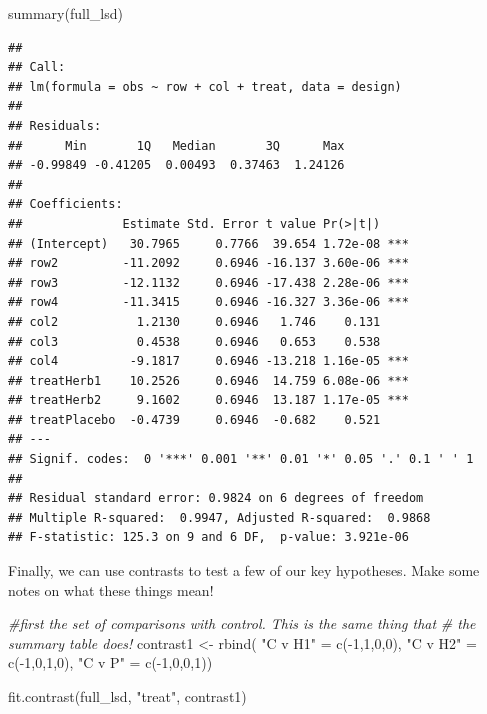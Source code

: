 \documentclass[
]{book}
\newenvironment{Shaded}{\begin{snugshade}}{\end{snugshade}}
\newcommand{\CommentTok}[1]{\textcolor[rgb]{0.56,0.35,0.01}{\textit{#1}}}
\newcommand{\DecValTok}[1]{\textcolor[rgb]{0.00,0.00,0.81}{#1}}
\newcommand{\FunctionTok}[1]{\textcolor[rgb]{0.00,0.00,0.00}{#1}}
\newcommand{\NormalTok}[1]{#1}
\newcommand{\OtherTok}[1]{\textcolor[rgb]{0.56,0.35,0.01}{#1}}
\newcommand{\SpecialCharTok}[1]{\textcolor[rgb]{0.00,0.00,0.00}{#1}}
\newcommand{\StringTok}[1]{\textcolor[rgb]{0.31,0.60,0.02}{#1}}
\begin{document}
\begin{Shaded}
\begin{Highlighting}[]
\FunctionTok{summary}\NormalTok{(full\_lsd)}
\end{Highlighting}
\end{Shaded}

\begin{verbatim}
## 
## Call:
## lm(formula = obs ~ row + col + treat, data = design)
## 
## Residuals:
##      Min       1Q   Median       3Q      Max 
## -0.99849 -0.41205  0.00493  0.37463  1.24126 
## 
## Coefficients:
##              Estimate Std. Error t value Pr(>|t|)    
## (Intercept)   30.7965     0.7766  39.654 1.72e-08 ***
## row2         -11.2092     0.6946 -16.137 3.60e-06 ***
## row3         -12.1132     0.6946 -17.438 2.28e-06 ***
## row4         -11.3415     0.6946 -16.327 3.36e-06 ***
## col2           1.2130     0.6946   1.746    0.131    
## col3           0.4538     0.6946   0.653    0.538    
## col4          -9.1817     0.6946 -13.218 1.16e-05 ***
## treatHerb1    10.2526     0.6946  14.759 6.08e-06 ***
## treatHerb2     9.1602     0.6946  13.187 1.17e-05 ***
## treatPlacebo  -0.4739     0.6946  -0.682    0.521    
## ---
## Signif. codes:  0 '***' 0.001 '**' 0.01 '*' 0.05 '.' 0.1 ' ' 1
## 
## Residual standard error: 0.9824 on 6 degrees of freedom
## Multiple R-squared:  0.9947, Adjusted R-squared:  0.9868 
## F-statistic: 125.3 on 9 and 6 DF,  p-value: 3.921e-06
\end{verbatim}

Finally, we can use contrasts to test a few of our key hypotheses. Make some notes on what these things mean!

\begin{Shaded}
\begin{Highlighting}[]
\CommentTok{\#first the set of comparisons with control.  This is the same thing that }
\CommentTok{\# the summary table does!}
\NormalTok{contrast1 }\OtherTok{\textless{}{-}} \FunctionTok{rbind}\NormalTok{(}
  \StringTok{"C v H1"} \OtherTok{=} \FunctionTok{c}\NormalTok{(}\SpecialCharTok{{-}}\DecValTok{1}\NormalTok{,}\DecValTok{1}\NormalTok{,}\DecValTok{0}\NormalTok{,}\DecValTok{0}\NormalTok{),}
  \StringTok{"C v H2"} \OtherTok{=} \FunctionTok{c}\NormalTok{(}\SpecialCharTok{{-}}\DecValTok{1}\NormalTok{,}\DecValTok{0}\NormalTok{,}\DecValTok{1}\NormalTok{,}\DecValTok{0}\NormalTok{),}
  \StringTok{"C v P"} \OtherTok{=} \FunctionTok{c}\NormalTok{(}\SpecialCharTok{{-}}\DecValTok{1}\NormalTok{,}\DecValTok{0}\NormalTok{,}\DecValTok{0}\NormalTok{,}\DecValTok{1}\NormalTok{))}

\FunctionTok{fit.contrast}\NormalTok{(full\_lsd, }\StringTok{"treat"}\NormalTok{, contrast1)}
\end{Highlighting}
\end{Shaded}
\end{document}
